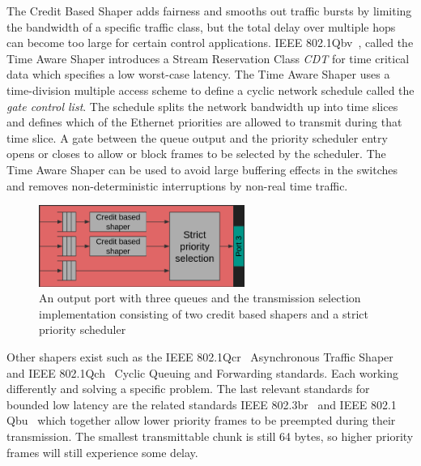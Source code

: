 The Credit Based Shaper adds fairness and smooths out traffic bursts by limiting the bandwidth of a specific traffic class, but the total delay over multiple hops can become too large for certain control applications. IEEE 802.1Qbv~\cite{IEEE8021Qbv}, called the Time Aware Shaper introduces a Stream Reservation Class \textit{CDT} for time critical data which specifies a low worst-case latency. The Time Aware Shaper uses a time-division multiple access scheme to define a cyclic network schedule called the \textit{gate control list}. The schedule splits the network bandwidth up into time slices and defines which of the Ethernet priorities are allowed to transmit during that time slice. A gate between the queue output and the priority scheduler entry opens or closes to allow or block frames to be selected by the scheduler. The Time Aware Shaper can be used to avoid large buffering effects in the switches and removes non-deterministic interruptions by non-real time traffic.

\begin{figure}[htbp]
    \centering
    \includegraphics[width=0.6\textwidth]{images/cbs.png}
    \caption{An output port with three queues and the transmission selection implementation consisting of two credit based shapers and a strict priority scheduler}
    \label{fig:cbs}
\end{figure}

Other shapers exist such as the IEEE 802.1Qcr~\cite{IEEE8021Qcr} Asynchronous Traffic Shaper and IEEE 802.1Qch~\cite{IEEE8021Qch} Cyclic Queuing and Forwarding standards. Each working differently and solving a specific problem. The last relevant standards for bounded low latency are the related standards IEEE 802.3br~\cite{IEEE8023br} and IEEE 802.1 Qbu~\cite{IEEE8021Qbu} which together allow lower priority frames to be preempted during their transmission. The smallest transmittable chunk is still 64 bytes, so higher priority frames will still experience some delay. 


